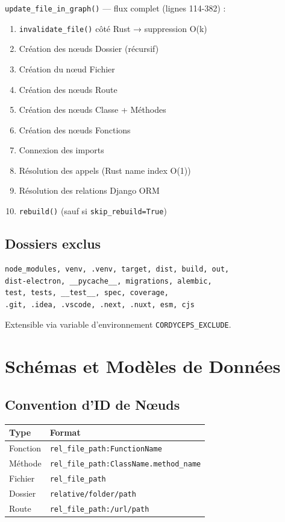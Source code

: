 \documentclass[12pt,a4paper]{article}
\newcommand{\code}[1]{\texttt{#1}}
\begin{document}
\code{update\_file\_in\_graph()} — flux complet (lignes 114-382) :

\begin{enumerate}
    \item \code{invalidate\_file()} côté Rust → suppression O(k)
    \item Création des nœuds Dossier (récursif)
    \item Création du nœud Fichier
    \item Création des nœuds Route
    \item Création des nœuds Classe + Méthodes
    \item Création des nœuds Fonctions
    \item Connexion des imports
    \item Résolution des appels (Rust name index O(1))
    \item Résolution des relations Django ORM
    \item \code{rebuild()} (sauf si \code{skip\_rebuild=True})
\end{enumerate}

\subsection{Dossiers exclus}

\begin{verbatim}
node_modules, venv, .venv, target, dist, build, out,
dist-electron, __pycache__, migrations, alembic,
test, tests, __test__, spec, coverage,
.git, .idea, .vscode, .next, .nuxt, esm, cjs
\end{verbatim}

Extensible via variable d'environnement \code{CORDYCEPS\_EXCLUDE}.

\section{Schémas et Modèles de Données}

\subsection{Convention d'ID de Nœuds}

\begin{center}
\begin{tabularx}{\textwidth}{lX}
\toprule
\textbf{Type} & \textbf{Format} \\
\midrule
Fonction & \code{rel\_file\_path:FunctionName} \\
Méthode & \code{rel\_file\_path:ClassName.method\_name} \\
Fichier & \code{rel\_file\_path} \\
Dossier & \code{relative/folder/path} \\
Route & \code{rel\_file\_path:/url/path} \\
\bottomrule
\end{tabularx}
\end{center}
\end{document}
